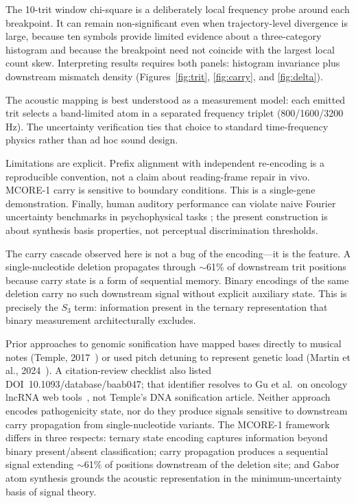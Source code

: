 \documentclass[preprint,12pt]{elsarticle}
\begin{document}
The 10-trit window chi-square is a deliberately local frequency probe around each breakpoint. It can remain non-significant even when trajectory-level divergence is large, because ten symbols provide limited evidence about a three-category histogram and because the breakpoint need not coincide with the largest local count skew. Interpreting results requires both panels: histogram invariance plus downstream mismatch density (Figures~\ref{fig:trit}, \ref{fig:carry}, and \ref{fig:delta}).

The acoustic mapping is best understood as a measurement model: each emitted trit selects a band-limited atom in a separated frequency triplet (800/1600/3200\,Hz). The uncertainty verification ties that choice to standard time-frequency physics rather than ad hoc sound design.

Limitations are explicit. Prefix alignment with independent re-encoding is a reproducible convention, not a claim about reading-frame repair in vivo. MCORE-1 carry is sensitive to boundary conditions. This is a single-gene demonstration. Finally, human auditory performance can violate naive Fourier uncertainty benchmarks in psychophysical tasks \citep{oppenheim2013human}; the present construction is about synthesis basis properties, not perceptual discrimination thresholds.

The carry cascade observed here is not a bug of the encoding---it is the feature. A single-nucleotide deletion propagates through $\sim$61\% of downstream trit positions because carry state is a form of sequential memory. Binary encodings of the same deletion carry no such downstream signal without explicit auxiliary state. This is precisely the $S_3$ term: information present in the ternary representation that binary measurement architecturally excludes.

Prior approaches to genomic sonification have mapped bases directly to musical notes (Temple, 2017~\citep{temple2017dna}) or used pitch detuning to represent genetic load (Martin et al., 2024~\citep{martin2024genomic}). A citation-review checklist also listed DOI~10.1093/database/baab047; that identifier resolves to Gu et al.\ on oncology lncRNA web tools~\citep{gu2021baab047}, not Temple's DNA sonification article. Neither approach encodes pathogenicity state, nor do they produce signals sensitive to downstream carry propagation from single-nucleotide variants. The MCORE-1 framework differs in three respects: ternary state encoding captures information beyond binary present/absent classification; carry propagation produces a sequential signal extending $\sim$61\% of positions downstream of the deletion site; and Gabor atom synthesis grounds the acoustic representation in the minimum-uncertainty basis of signal theory.
\end{document}
